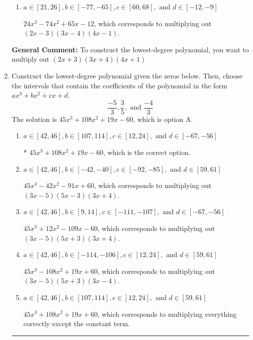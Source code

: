 \documentclass{extbook}[14pt]
\newcommand{\litem}[1]{\item #1

\rule{\textwidth}{0.4pt}}
\begin{document}
\begin{enumerate}
{\begin{enumerate}[label=\Alph*.]
$24x^{3} +74 x^{2} +65 x -12$, which corresponds to multiplying everything correctly except the constant term.
\item \( a \in [21, 26], b \in [-77, -65], c \in [60, 68], \text{ and } d \in [-12, -9] \)

$24x^{3} -74 x^{2} +65 x -12$, which corresponds to multiplying out $(2x -3)(3x -4)(4x -1)$.
\end{enumerate}

\textbf{General Comment:} To construct the lowest-degree polynomial, you want to multiply out $(2x + 3)(3x + 4)(4x + 1)$
}
\litem{
Construct the lowest-degree polynomial given the zeros below. Then, choose the intervals that contain the coefficients of the polynomial in the form $ax^3+bx^2+cx+d$.
\[ \frac{-5}{3}, \frac{3}{5}, \text{ and } \frac{-4}{3} \]The solution is \( 45x^{3} +108 x^{2} +19 x -60 \), which is option A.\begin{enumerate}[label=\Alph*.]
\item \( a \in [42, 46], b \in [107, 114], c \in [12, 24], \text{ and } d \in [-67, -56] \)

* $45x^{3} +108 x^{2} +19 x -60$, which is the correct option.
\item \( a \in [42, 46], b \in [-42, -40], c \in [-92, -85], \text{ and } d \in [59, 61] \)

$45x^{3} -42 x^{2} -91 x + 60$, which corresponds to multiplying out $(3x -5)(5x -3)(3x + 4)$.
\item \( a \in [42, 46], b \in [9, 14], c \in [-111, -107], \text{ and } d \in [-67, -56] \)

$45x^{3} +12 x^{2} -109 x -60$, which corresponds to multiplying out $(3x -5)(5x + 3)(3x + 4)$.
\item \( a \in [42, 46], b \in [-114, -106], c \in [12, 24], \text{ and } d \in [59, 61] \)

$45x^{3} -108 x^{2} +19 x + 60$, which corresponds to multiplying out $(3x -5)(5x + 3)(3x -4)$.
\item \( a \in [42, 46], b \in [107, 114], c \in [12, 24], \text{ and } d \in [59, 61] \)

$45x^{3} +108 x^{2} +19 x + 60$, which corresponds to multiplying everything correctly except the constant term.
\end{enumerate}

}
\end{enumerate}
\end{document}

